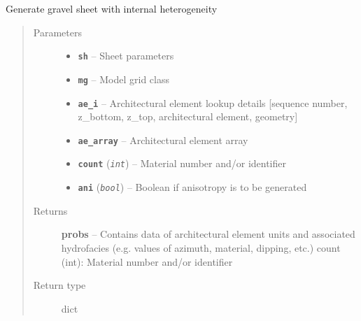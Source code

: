 \documentclass[letterpaper,10pt,english]{sphinxmanual}
\begin{document}
\begin{fulllineitems}
\label{hyvr:hyvr.hyvr.sim.gen_sheet}
Generate gravel sheet with internal heterogeneity
\begin{quote}\begin{description}
\item[{Parameters}] \leavevmode\begin{itemize}
\item {} 
\textbf{\texttt{sh}} -- Sheet parameters

\item {} 
\textbf{\texttt{mg}} -- Model grid class

\item {} 
\textbf{\texttt{ae\_i}} -- Architectural element lookup details {[}sequence number, z\_bottom, z\_top, architectural element, geometry{]}

\item {} 
\textbf{\texttt{ae\_array}} -- Architectural element array

\item {} 
\textbf{\texttt{count}} (\emph{\texttt{int}}) -- Material number and/or identifier

\item {} 
\textbf{\texttt{ani}} (\emph{\texttt{bool}}) -- Boolean if anisotropy is to be generated

\end{itemize}

\item[{Returns}] \leavevmode
\textbf{probs} -- Contains data of architectural element units and associated hydrofacies (e.g. values of azimuth, material, dipping, etc.)
count (int):    Material number and/or identifier

\item[{Return type}] \leavevmode
dict

\end{description}\end{quote}

\end{fulllineitems}

\end{document}
